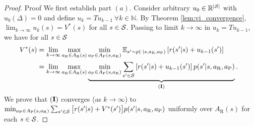 \documentclass[aoas]{imsart}
\theoremstyle{plain}
\theoremstyle{definition}
\newcommand{\abs}[1]{\left\lvert#1\right\rvert}
\begin{document}
       \begin{proof}{Proof}
           We first establish part $(a)$. Consider arbitrary $u_0 \in \mathbb{R}^{\abs{\cal S}}$ with $u_0(\Delta) = 0$ and define $u_{k} = Tu_{k-1} \ \forall k \in \mathbb{N}$. By Theorem \ref{lem:vi_convergence}, $\lim_{k \to \infty}u_k(s) = V^*(s)$ for all $s \in {\cal S}$. Passing to limit $k \to \infty$ in $u_k = Tu_{k-1}$,  we have for all $s \in {\cal S}$ 
           \begingroup
           \allowdisplaybreaks
           \begin{align}
           \nonumber
           V^*(s) &= \lim_{k\to\infty}\max_{a_\text{R} \in A_\text{R}(s)}\min_{a_\text{P} \in A_\text{P}(s,a_\text{R})}\mathbb{E}_{s' \sim p(\cdot|s,a_\text{R},a_\text{P})}\left[r(s'|s) + u_{k-1}(s')\right]\\
           \label{eqn:bellman_equation_temp1}
           &= \lim_{k \to \infty}\max_{a_\text{R} \in A_\text{R}(s)}\underbrace{\min_{a_\text{P} \in A_\text{P}(s,a_\text{R})}\sum_{s' \in {\cal S}}\left[r(s'|s) + u_{k-1}(s')\right]p(s'|s,a_\text{R},a_\text{P})}_{{\bf (I)}}.
           \end{align}
           \endgroup
           We prove that $\bf (I)$ converges (as $k \to \infty$) to $\min_{a_\text{P} \in A_\text{P}(s,a_\text{R})}\sum_{s' \in {\cal S}}\big[r(s'|s) + V^*(s')\big]p(s'|s,a_\text{R},a_\text{P})$ uniformly over $A_\text{R}(s)$ for each $s \in {\cal S}$.
           

\end{proof}
\end{document}
